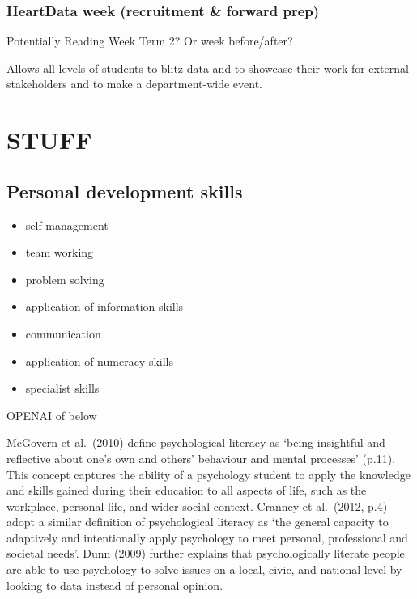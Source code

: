 \documentclass[
  11pt,
  letterpaper,
  oneside,
  open=any]{scrbook}
\begin{document}
\hypertarget{heartdata-week-recruitment-forward-prep}{%
\subsection{HeartData week (recruitment \& forward
prep)}\label{heartdata-week-recruitment-forward-prep}}

Potentially Reading Week Term 2? Or week before/after?

Allows all levels of students to blitz data and to showcase their work
for external stakeholders and to make a department-wide event.


\hypertarget{stuff}{%
\chapter{STUFF}\label{stuff}}

\hypertarget{personal-development-skills}{%
\section{\texorpdfstring{\textbf{Personal development
skills}}{Personal development skills}}\label{personal-development-skills}}

\begin{itemize}
\item
  self-management
\item
  team working
\item
  problem solving
\item
  application of information skills
\item
  communication
\item
  application of numeracy skills
\item
  specialist skills
\end{itemize}

OPENAI of below

McGovern et al.~(2010) define psychological literacy as `being
insightful and reflective about one's own and others' behaviour and
mental processes' (p.11). This concept captures the ability of a
psychology student to apply the knowledge and skills gained during their
education to all aspects of life, such as the workplace, personal life,
and wider social context. Cranney et al.~(2012, p.4) adopt a similar
definition of psychological literacy as `the general capacity to
adaptively and intentionally apply psychology to meet personal,
professional and societal needs'. Dunn (2009) further explains that
psychologically literate people are able to use psychology to solve
issues on a local, civic, and national level by looking to data instead
of personal opinion.
\end{document}
